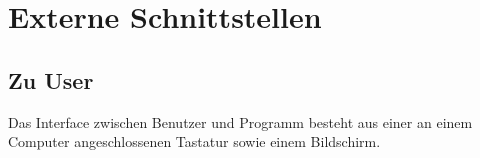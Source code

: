 \section{Externe Schnittstellen}
\label{sec:extIf}
\subsection{Zu User}
Das Interface zwischen Benutzer und Programm besteht aus einer an einem Computer angeschlossenen Tastatur sowie einem Bildschirm.



